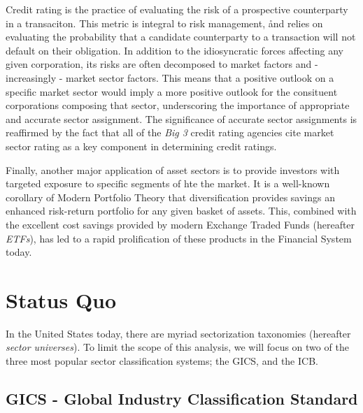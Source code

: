 \documentclass[../main.tex]{subfiles}
\begin{document}
Credit rating is the practice of evaluating the risk of a prospective counterparty in a transaciton. This metric is integral to risk management, ånd relies on evaluating the probability that a candidate counterparty to a transaction will not default on their obligation. In addition to the idiosyncratic forces affecting any given corporation, its risks are often decomposed to market factors and - increasingly - market sector factors. This means that a positive outlook on a specific market sector would imply a more positive outlook for the consituent corporations composing that sector, underscoring the importance of appropriate and accurate sector assignment. The significance of accurate sector assignments is reaffirmed by the fact that all of the \textit{Big 3} credit rating agencies cite market sector rating as a key component in determining credit ratings.

Finally, another major application of asset sectors is to provide investors with targeted exposure to specific segments of hte the market. It is a well-known corollary of Modern Portfolio Theory that diversification provides savings an enhanced risk-return portfolio for any given basket of assets. This, combined with the excellent cost savings provided by modern Exchange Traded Funds (hereafter \textit{ETFs}), has led to a rapid prolification of these products in the Financial System today.

\section{Status Quo}

In the United States today, there are myriad sectorization taxonomies (hereafter \textit{sector universes}). To limit the scope of this analysis, we will focus on two of the three most popular sector classification systems; the GICS, and the ICB.

\subsection{GICS - Global Industry Classification Standard}
\end{document}
